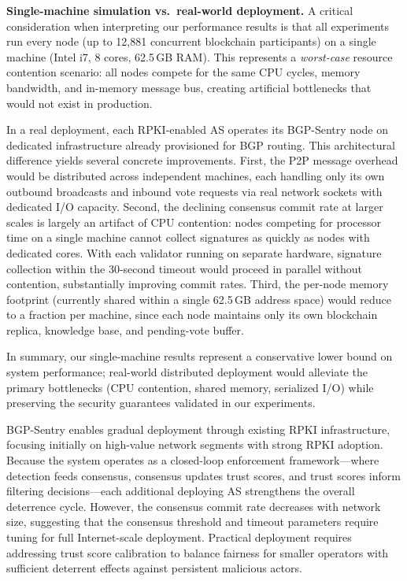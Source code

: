 {\color{red}
\textbf{Single-machine simulation vs.\ real-world deployment.}
A critical consideration when interpreting our performance results is that all experiments run every node (up to 12{,}881 concurrent blockchain participants) on a single machine (Intel i7, 8 cores, 62.5\,GB RAM). This represents a \emph{worst-case} resource contention scenario: all nodes compete for the same CPU cycles, memory bandwidth, and in-memory message bus, creating artificial bottlenecks that would not exist in production.

In a real deployment, each RPKI-enabled AS operates its BGP-Sentry node on dedicated infrastructure already provisioned for BGP routing. This architectural difference yields several concrete improvements. First, the P2P message overhead would be distributed across independent machines, each handling only its own outbound broadcasts and inbound vote requests via real network sockets with dedicated I/O capacity. Second, the declining consensus commit rate at larger scales is largely an artifact of CPU contention: nodes competing for processor time on a single machine cannot collect signatures as quickly as nodes with dedicated cores. With each validator running on separate hardware, signature collection within the 30-second timeout would proceed in parallel without contention, substantially improving commit rates. Third, the per-node memory footprint (currently shared within a single 62.5\,GB address space) would reduce to a fraction per machine, since each node maintains only its own blockchain replica, knowledge base, and pending-vote buffer.

In summary, our single-machine results represent a conservative lower bound on system performance; real-world distributed deployment would alleviate the primary bottlenecks (CPU contention, shared memory, serialized I/O) while preserving the security guarantees validated in our experiments.
}

BGP-Sentry enables gradual deployment through existing RPKI infrastructure, focusing initially on high-value network segments with strong RPKI adoption. Because the system operates as a closed-loop enforcement framework---where detection feeds consensus, consensus updates trust scores, and trust scores inform filtering decisions---each additional deploying AS strengthens the overall deterrence cycle.  However, the consensus commit rate decreases with network size, suggesting that the consensus threshold and timeout parameters require tuning for full Internet-scale deployment. Practical deployment requires addressing trust score calibration to balance fairness for smaller operators with sufficient deterrent effects against persistent malicious actors.

